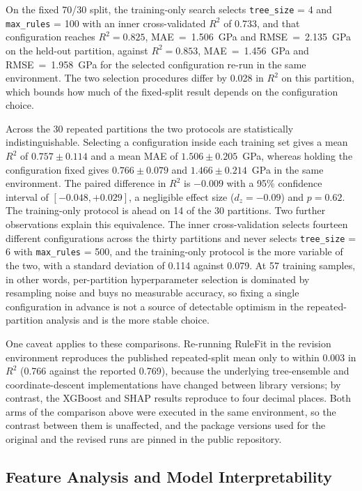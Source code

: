 \documentclass[pdflatex,sn-mathphys-num]{sn-jnl}%
\newif\ifrevmarks%
\newcommand{\revmark}[1]{\ifrevmarks\textcolor{revblue}{#1}\else#1\fi}%
\theoremstyle{thmstyleone}%
\theoremstyle{thmstyletwo}%
\theoremstyle{thmstylethree}%
\begin{document}
\revmark{On the fixed 70/30 split, the training-only search selects \texttt{tree\_size} = 4 and \texttt{max\_rules} = 100 with an inner cross-validated $R^2$ of 0.733, and that configuration reaches $R^2 = 0.825$, MAE~=~1.506~GPa and RMSE~=~2.135~GPa on the held-out partition, against $R^2 = 0.853$, MAE~=~1.456~GPa and RMSE~=~1.958~GPa for the selected configuration re-run in the same environment. The two selection procedures differ by 0.028 in $R^2$ on this partition, which bounds how much of the fixed-split result depends on the configuration choice.}

\revmark{Across the 30 repeated partitions the two protocols are statistically indistinguishable. Selecting a configuration inside each training set gives a mean $R^2$ of $0.757 \pm 0.114$ and a mean MAE of $1.506 \pm 0.205$~GPa, whereas holding the configuration fixed gives $0.766 \pm 0.079$ and $1.466 \pm 0.214$~GPa in the same environment. The paired difference in $R^2$ is $-0.009$ with a 95\% confidence interval of $[-0.048, +0.029]$, a negligible effect size ($d_z = -0.09$) and $p = 0.62$. The training-only protocol is ahead on 14 of the 30 partitions. Two further observations explain this equivalence. The inner cross-validation selects fourteen different configurations across the thirty partitions and never selects \texttt{tree\_size} = 6 with \texttt{max\_rules} = 500, and the training-only protocol is the more variable of the two, with a standard deviation of 0.114 against 0.079. At 57 training samples, in other words, per-partition hyperparameter selection is dominated by resampling noise and buys no measurable accuracy, so fixing a single configuration in advance is not a source of detectable optimism in the repeated-partition analysis and is the more stable choice.}

\revmark{One caveat applies to these comparisons. Re-running RuleFit in the revision environment reproduces the published repeated-split mean only to within 0.003 in $R^2$ (0.766 against the reported 0.769), because the underlying tree-ensemble and coordinate-descent implementations have changed between library versions; by contrast, the XGBoost and SHAP results reproduce to four decimal places. Both arms of the comparison above were executed in the same environment, so the contrast between them is unaffected, and the package versions used for the original and the revised runs are pinned in the public repository.}

\subsection{Feature Analysis and Model Interpretability}
\label{sec:benchmark}
\end{document}
